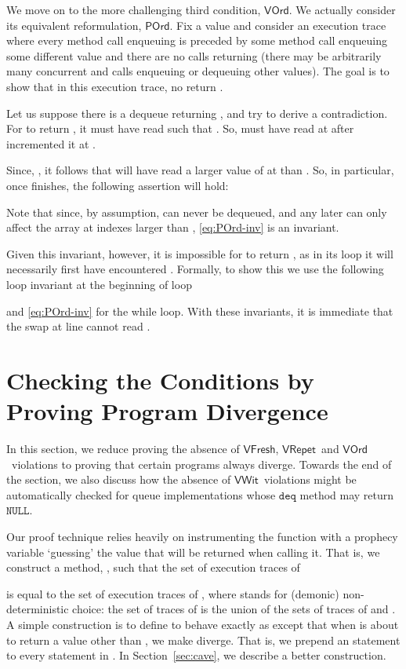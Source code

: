 \documentclass{LMCS}
\newcommand{\NULL}{\ensuremath{\mathtt{NULL}}}
\newcommand{\deq}{\ensuremath{\mathtt{deq}}}
\newcommand{\VFresh}{\ensuremath{\mathsf{VFresh}}}
\newcommand{\VRepet}{\ensuremath{\mathsf{VRepet}}}
\newcommand{\VOrd}{\ensuremath{\mathsf{VOrd}}}
\newcommand{\VWit}{\ensuremath{\mathsf{VWit}}}
\newcommand{\POrd}{\ensuremath{\mathsf{POrd}}}
\begin{document}
We move on to the more challenging third condition, \VOrd. 
We actually consider its equivalent reformulation, \POrd.
Fix a value  and consider an execution trace  where every method call enqueuing  
is preceded by some method call enqueuing some different value  and there
are no  calls returning  (there may be arbitrarily many concurrent
 and  calls enqueuing or dequeuing other values). 
The goal is to show that in this execution trace, no  return .

Let us suppose there is a dequeue  returning , and try to derive a contradiction.
For  to return , it must have read  such that
. So,  must have read  at  after
 incremented it at .

Since, , it follows that  will have read a larger
value of  at  than .  So, in particular, once 
finishes, the following assertion will hold:

Note that since, by assumption,  can never be dequeued, and any later
 can only affect the  array at indexes larger than ,
\eqref{eq:POrd-inv} is an invariant.

Given this invariant, however, it is impossible for  to return , as in
its loop it will necessarily first have encountered . Formally, to show this
we use the following loop invariant at the beginning of  loop

and \eqref{eq:POrd-inv} for the while loop. With these invariants, it is immediate
that the swap at line  cannot read .

\section{Checking the Conditions by Proving Program Divergence}
\label{sec:checking}

In this section, we reduce proving the absence of \VFresh, \VRepet\ and \VOrd\
violations to proving that certain programs always diverge.  Towards the end of
the section, we also discuss how the absence of \VWit\ violations might be automatically
checked for queue implementations whose {\deq} method may return \NULL.

Our proof technique relies heavily on instrumenting the  function
with a prophecy variable `guessing' the value that will be returned when
calling it.
That is, we construct a method, , such that the set of execution traces of
 
is equal to the set of execution traces of , where  stands for
(demonic) non-deterministic choice: the set of traces of  is
the union of the sets of traces of  and .
A simple construction is to define  to behave exactly as 
except that when  is about to return a value other than , 
we make  diverge.  That is, we prepend an 
statement to every  statement in .
In Section~\ref{sec:cave}, we describe a better construction.
\end{document}
